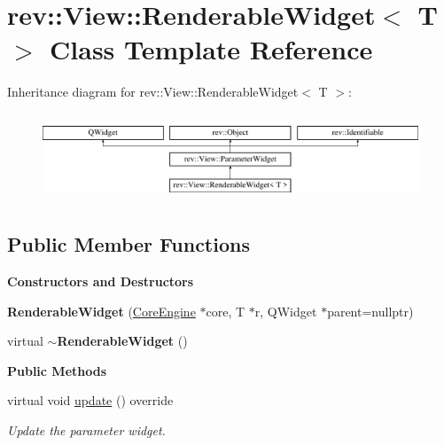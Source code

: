 \hypertarget{classrev_1_1_view_1_1_renderable_widget}{}\section{rev\+::View\+::Renderable\+Widget$<$ T $>$ Class Template Reference}
\label{classrev_1_1_view_1_1_renderable_widget}
Inheritance diagram for rev\+::View\+::Renderable\+Widget$<$ T $>$\+:\begin{figure}[H]
\begin{center}
\leavevmode
\includegraphics[height=2.629108cm]{classrev_1_1_view_1_1_renderable_widget}
\end{center}
\end{figure}
\subsection*{Public Member Functions}
\begin{Indent}\textbf{ Constructors and Destructors}\par
\begin{DoxyCompactItemize}
\item 
\mbox{\label{classrev_1_1_view_1_1_renderable_widget_a3bccfdece68da26aaffc67ef9b9fe778}} 
{\bfseries Renderable\+Widget} (\mbox{\hyperlink{classrev_1_1_core_engine}{Core\+Engine}} $\ast$core, T $\ast$r, Q\+Widget $\ast$parent=nullptr)
\item 
\mbox{\label{classrev_1_1_view_1_1_renderable_widget_aa519cd1e11ac37be4599c477a7a67dc6}} 
virtual {\bfseries $\sim$\+Renderable\+Widget} ()
\end{DoxyCompactItemize}
\end{Indent}
\begin{Indent}\textbf{ Public Methods}\par
\begin{DoxyCompactItemize}
\item 
\mbox{\label{classrev_1_1_view_1_1_renderable_widget_a7677866e11e0c6b2ff9d10c097565153}} 
virtual void \mbox{\hyperlink{classrev_1_1_view_1_1_renderable_widget_a7677866e11e0c6b2ff9d10c097565153}{update}} () override
\begin{DoxyCompactList}\small\item\em Update the parameter widget. \end{DoxyCompactList}\end{DoxyCompactItemize}
\end{Indent}
